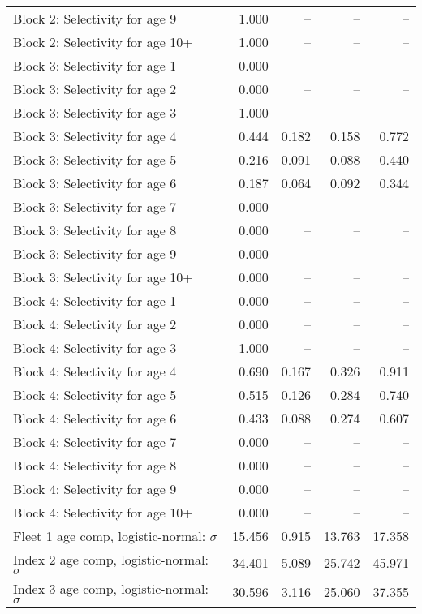 \documentclass[
]{article}
\begin{document}
\begin{landscape}
\begin{longtable}[t]{lrrrr}
Block 2: Selectivity for age 9 & 1.000 & -- & -- & --\\
Block 2: Selectivity for age 10+ & 1.000 & -- & -- & --\\
Block 3: Selectivity for age 1 & 0.000 & -- & -- & --\\
Block 3: Selectivity for age 2 & 0.000 & -- & -- & --\\
\addlinespace
Block 3: Selectivity for age 3 & 1.000 & -- & -- & --\\
Block 3: Selectivity for age 4 & 0.444 & 0.182 & 0.158 & 0.772\\
Block 3: Selectivity for age 5 & 0.216 & 0.091 & 0.088 & 0.440\\
Block 3: Selectivity for age 6 & 0.187 & 0.064 & 0.092 & 0.344\\
Block 3: Selectivity for age 7 & 0.000 & -- & -- & --\\
\addlinespace
Block 3: Selectivity for age 8 & 0.000 & -- & -- & --\\
Block 3: Selectivity for age 9 & 0.000 & -- & -- & --\\
Block 3: Selectivity for age 10+ & 0.000 & -- & -- & --\\
Block 4: Selectivity for age 1 & 0.000 & -- & -- & --\\
Block 4: Selectivity for age 2 & 0.000 & -- & -- & --\\
\addlinespace
Block 4: Selectivity for age 3 & 1.000 & -- & -- & --\\
Block 4: Selectivity for age 4 & 0.690 & 0.167 & 0.326 & 0.911\\
Block 4: Selectivity for age 5 & 0.515 & 0.126 & 0.284 & 0.740\\
Block 4: Selectivity for age 6 & 0.433 & 0.088 & 0.274 & 0.607\\
Block 4: Selectivity for age 7 & 0.000 & -- & -- & --\\
\addlinespace
Block 4: Selectivity for age 8 & 0.000 & -- & -- & --\\
Block 4: Selectivity for age 9 & 0.000 & -- & -- & --\\
Block 4: Selectivity for age 10+ & 0.000 & -- & -- & --\\
Fleet 1 age comp, logistic-normal: $\sigma$ & 15.456 & 0.915 & 13.763 & 17.358\\
Index 2 age comp, logistic-normal: $\sigma$ & 34.401 & 5.089 & 25.742 & 45.971\\
\addlinespace
Index 3 age comp, logistic-normal: $\sigma$ & 30.596 & 3.116 & 25.060 & 37.355\\*
\end{longtable}
\end{landscape}
\end{document}
